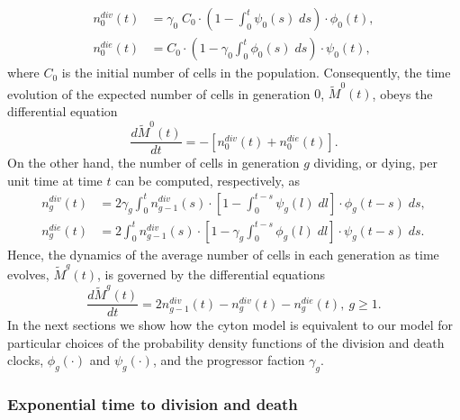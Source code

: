 \documentclass[10pt]{article}
\numberwithin{equation}{section}
\begin{document}
\begin{align}
    \label{n^div_0}
    n^{div}_{0}(t) & = \gamma_0 \; C_0 \cdot \left(1-
    \int_0^t \psi_0(s) \; ds \right) \cdot \phi_0(t), \\
    \label{n^die_0}
    n^{die}_{0}(t) & = C_0 \cdot \left(1-
    \gamma_0 \int_0^t \phi_0(s) \; ds \right) \cdot \psi_0(t),
\end{align}
where $C_0$ is the initial number of cells in the population. Consequently, the time evolution of the expected number of cells in generation $0$, ${\widetilde M}^0(t)$, obeys the differential equation 
\begin{equation}
    \label{Cyton_0}
    \frac{d{\widetilde M}^0(t)}{dt} = -\left[n^{div}_{0}(t) + n^{die}_{0}(t)\right].
\end{equation}
On the other hand, the number of cells in generation $g$ dividing, or dying, per unit time at time $t$ can be computed, respectively, as
\begin{align}
    \label{n^div_g}
    n^{div}_{g}(t) & = 2 \gamma_g \int_0^t n^{div}_{g-1}(s) \cdot \left[1-
    \int_0^{t-s} \psi_g(l) \; dl \right] \cdot \phi_g(t-s) \; ds, \\
    \label{n^die_g}
    n^{die}_{g}(t) & = 2 \int_0^t n^{div}_{g-1}(s) \cdot \left[1-
    \gamma_g \int_0^{t-s} \phi_g(l) \; dl \right] \cdot \psi_g(t-s) \; ds.
\end{align}
Hence, the dynamics of the average number of cells in each generation as time evolves, ${\widetilde M}^g(t)$, is governed by the differential equations
\begin{equation}
\label{Cyton_eqns}
    \frac{d{\widetilde M}^g(t)}{dt} = 2 n^{div}_{g-1}(t) - n^{div}_{g}(t) - n^{die}_{g}(t), \ g \ge 1.
\end{equation}
 In the next sections we show how the cyton model is equivalent to our model for particular choices of the probability density functions of the division and death clocks, $\phi_g(\cdot)$ and $\psi_g(\cdot)$, and the progressor faction $\gamma_g$.

\subsubsection{Exponential time to division and death} 
\end{document}
